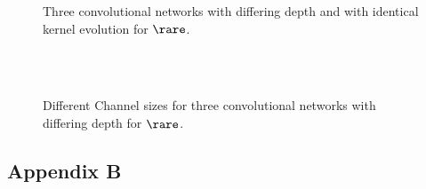 \begin{figure}[!htp]
	
\end{figure}
\begin{figure}
	\scalebox{.9}{}
	\scalebox{.9}{}
	\scalebox{.9}{}
	\caption{Three convolutional networks with differing depth and with identical kernel evolution for $\rare$.}
\end{figure}
\begin{figure}
	\scalebox{1}{}\\
	\scalebox{1}{}\\
	\scalebox{1}{}
	\caption{Different Channel sizes for three convolutional networks with differing depth for $\rare$.}
\end{figure}
\subsection{Appendix B}\label{Sec:AppendixA}
